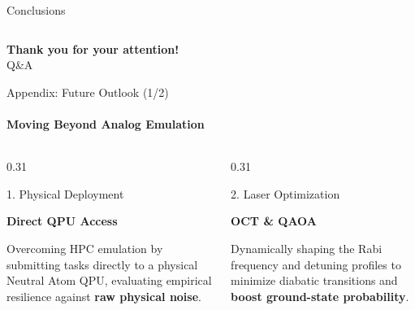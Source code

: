 \documentclass[10pt, aspectratio=169]{beamer}
\begin{document}
\begin{frame}{Conclusions}
\begin{columns}[T]
    \end{columns}
    
\end{frame}


\begin{frame}
    \begin{center}
        \Large \textbf{Thank you for your attention!} \\
        \vspace{0.5 cm}
        \normalsize Q\&A
    \end{center}
\end{frame}

\appendix

\begin{frame}{Appendix: Future Outlook (1/2)}
    \framesubtitle{Moving Beyond Analog Emulation}
    
    \vspace{0.3cm}
    
    \begin{columns}[T]
        
        \begin{column}{0.31\textwidth}
            \begin{block}{1. Physical Deployment}
                \begin{minipage}[t][4.5cm][t]{\linewidth}
                    \centering
                    \vspace{0.3cm}
                    {\large \textbf{Direct QPU Access}}\\[0.3cm]
                    \raggedright
                    \small Overcoming HPC emulation by submitting tasks directly to a physical Neutral Atom QPU, evaluating empirical resilience against \textbf{raw physical noise}.
                \end{minipage}
            \end{block}
        \end{column}
        
        \begin{column}{0.31\textwidth}
            \begin{block}{2. Laser Optimization}
                \begin{minipage}[t][4.5cm][t]{\linewidth}
                    \centering
                    \vspace{0.3cm}
                    {\large \textbf{OCT \& QAOA}}\\[0.3cm]
                    \raggedright
                    \small Dynamically shaping the Rabi frequency and detuning profiles to minimize diabatic transitions and \textbf{boost ground-state probability}.
                \end{minipage}
            \end{block}
        \end{column}
        

\end{columns}
\end{frame}
\end{document}
